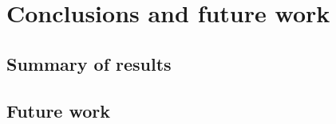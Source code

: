 \section{Conclusions and future work}\label{sec:conclusions}

\subsection{Summary of results}
\subsection{Future work}
